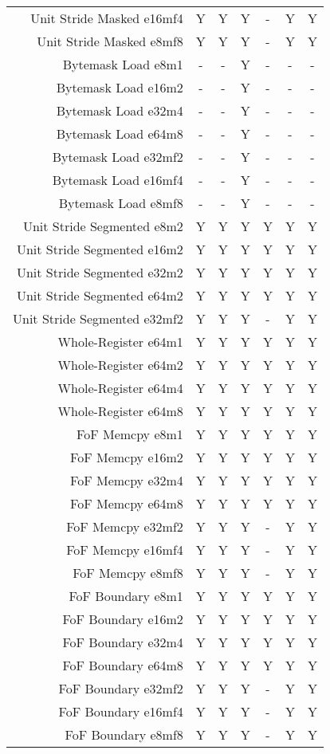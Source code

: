 \begin{longtable}{rcccccc}
Unit Stride Masked e16mf4 & Y & Y & Y & - & Y & Y\\
Unit Stride Masked e8mf8 & Y & Y & Y & - & Y & Y\\
Bytemask Load e8m1 & - & - & Y & - & - & -\\
Bytemask Load e16m2 & - & - & Y & - & - & -\\
Bytemask Load e32m4 & - & - & Y & - & - & -\\
Bytemask Load e64m8 & - & - & Y & - & - & -\\
Bytemask Load e32mf2 & - & - & Y & - & - & -\\
Bytemask Load e16mf4 & - & - & Y & - & - & -\\
Bytemask Load e8mf8 & - & - & Y & - & - & -\\
Unit Stride Segmented e8m2 & Y & Y & Y & Y & Y & Y\\
Unit Stride Segmented e16m2 & Y & Y & Y & Y & Y & Y\\
Unit Stride Segmented e32m2 & Y & Y & Y & Y & Y & Y\\
Unit Stride Segmented e64m2 & Y & Y & Y & Y & Y & Y\\
Unit Stride Segmented e32mf2 & Y & Y & Y & - & Y & Y\\
Whole-Register e64m1 & Y & Y & Y & Y & Y & Y\\
Whole-Register e64m2 & Y & Y & Y & Y & Y & Y\\
Whole-Register e64m4 & Y & Y & Y & Y & Y & Y\\
Whole-Register e64m8 & Y & Y & Y & Y & Y & Y\\
FoF Memcpy e8m1 & Y & Y & Y & Y & Y & Y\\
FoF Memcpy e16m2 & Y & Y & Y & Y & Y & Y\\
FoF Memcpy e32m4 & Y & Y & Y & Y & Y & Y\\
FoF Memcpy e64m8 & Y & Y & Y & Y & Y & Y\\
FoF Memcpy e32mf2 & Y & Y & Y & - & Y & Y\\
FoF Memcpy e16mf4 & Y & Y & Y & - & Y & Y\\
FoF Memcpy e8mf8 & Y & Y & Y & - & Y & Y\\
FoF Boundary e8m1 & Y & Y & Y & Y & Y & Y\\
FoF Boundary e16m2 & Y & Y & Y & Y & Y & Y\\
FoF Boundary e32m4 & Y & Y & Y & Y & Y & Y\\
FoF Boundary e64m8 & Y & Y & Y & Y & Y & Y\\
FoF Boundary e32mf2 & Y & Y & Y & - & Y & Y\\
FoF Boundary e16mf4 & Y & Y & Y & - & Y & Y\\
FoF Boundary e8mf8 & Y & Y & Y & - & Y & Y\\
\bottomrule
\end{longtable}
